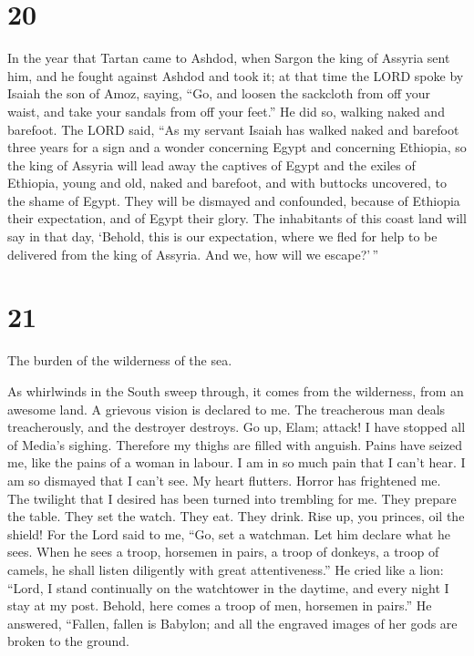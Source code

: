 \hypertarget{section-19}{%
\section{20}\label{section-19}}

 In the year that Tartan came to Ashdod, when Sargon the
king of Assyria sent him, and he fought against Ashdod and took it;
 at that time the LORD spoke by Isaiah the son of Amoz,
saying, ``Go, and loosen the sackcloth from off your waist, and take
your sandals from off your feet.'' He did so, walking naked and
barefoot.  The LORD said, ``As my servant Isaiah has walked
naked and barefoot three years for a sign and a wonder concerning Egypt
and concerning Ethiopia,  so the king of Assyria will lead
away the captives of Egypt and the exiles of Ethiopia, young and old,
naked and barefoot, and with buttocks uncovered, to the shame of Egypt.
 They will be dismayed and confounded, because of Ethiopia
their expectation, and of Egypt their glory.  The
inhabitants of this coast land will say in that day, `Behold, this is
our expectation, where we fled for help to be delivered from the king of
Assyria. And we, how will we escape?'\,''

\hypertarget{section-20}{%
\section{21}\label{section-20}}

 The burden of the wilderness of the sea.

As whirlwinds in the South sweep through, it comes from the wilderness,
from an awesome land.  A grievous vision is declared to me.
The treacherous man deals treacherously, and the destroyer destroys. Go
up, Elam; attack! I have stopped all of Media's sighing. 
Therefore my thighs are filled with anguish. Pains have seized me, like
the pains of a woman in labour. I am in so much pain that I can't hear.
I am so dismayed that I can't see.  My heart flutters.
Horror has frightened me. The twilight that I desired has been turned
into trembling for me.  They prepare the table. They set the
watch. They eat. They drink. Rise up, you princes, oil the shield!
 For the Lord said to me, ``Go, set a watchman. Let him
declare what he sees.  When he sees a troop, horsemen in
pairs, a troop of donkeys, a troop of camels, he shall listen diligently
with great attentiveness.''  He cried like a lion: ``Lord, I
stand continually on the watchtower in the daytime, and every night I
stay at my post.  Behold, here comes a troop of men,
horsemen in pairs.'' He answered, ``Fallen, fallen is Babylon; and all
the engraved images of her gods are broken to the ground.

